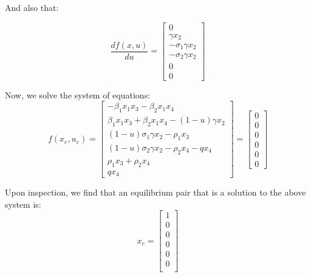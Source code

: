 \documentclass[letterpaper,twocolumn,10pt]{article}
\begin{document}
And also that:

\begin{equation*}
\frac{df(x, u)}{du}
=
\begin{bmatrix}
0\\
\gamma x_{2}\\
-\sigma_{1}\gamma x_{2}\\
-\sigma_{2}\gamma x_{2}\\
0\\
0
\end{bmatrix}
\end{equation*}

Now, we solve the system of equations:
\begin{equation*}
f(x_{e}, u_{e})
=
\begin{bmatrix}
-\beta_{1}x_{1}x_{3} - \beta_{2}x_{1}x_{4}\\
\beta_{1}x_{1}x_{3} + \beta_{2}x_{1}x_{4} - (1-u)\gamma x_{2}\\
(1-u)\sigma_{1}\gamma x_{2} - \rho_{1}x_{3}\\
(1-u)\sigma_{2}\gamma x_{2} - \rho_{2}x_{4} - qx_{4}\\
\rho_{1}x_{3} + \rho_{2}x_{4}\\
qx_{4}
\end{bmatrix}
=
\begin{bmatrix}
0\\
0\\
0\\
0\\
0\\
0
\end{bmatrix}
\end{equation*}

Upon inspection, we find that an equilibrium pair that is a solution to the above system is:
\begin{equation*}
x_{e}
=
\begin{bmatrix}
1\\
0\\
0\\
0\\
0\\
0\\
\end{bmatrix}
\end{equation*}
\end{document}
